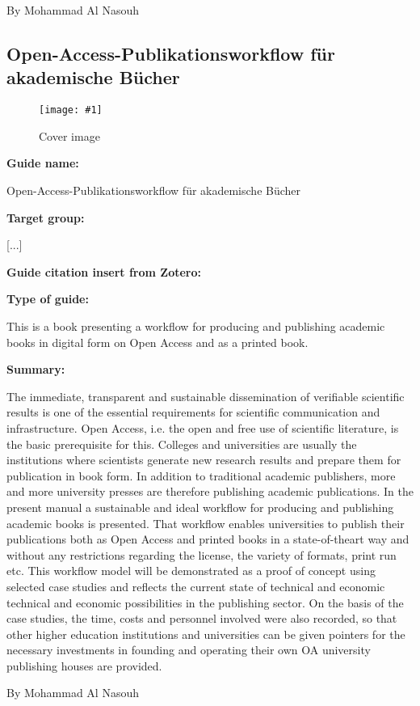 \documentclass{article}
\newlength{\imgwidth}
\newcommand\scaledgraphics[2]{%
                
\settowidth{\imgwidth}{\texttt{[image: \#1]}}%
                
\setlength{\imgwidth}{\minof{\imgwidth}{#2\textwidth}}%
                
\texttt{[image: \#1]}%
                
}
\begin{document}
By Mohammad Al Nasouh 





\subsection{Open-Access-Publikationsworkflow für akademische Bücher}\label{H6691479}



\begin{center}
\begin{figure}
\scaledgraphics{39363ae5-01d9-4e5a-a46f-bf20971df65a.jpg}{0.5}
\caption*{Cover image}\label{F7674061}
\end{figure}


\end{center}




\textbf{Guide name:} 

Open-Access-Publikationsworkflow für akademische Bücher


\textbf{Target group:}

[...]


\textbf{Guide citation insert from Zotero:}

\autocite{bohm_open-access-publikationsworkflow_2020}


\textbf{Type of guide: }

This is a book presenting a workflow for producing and publishing academic books in digital form on Open Access and as a printed book.


\textbf{Summary: }

The immediate, transparent and sustainable dissemination of verifiable scientific results is one of the essential requirements for scientific communication and infrastructure. Open Access, i.e. the open and free use of scientific literature, is the basic prerequisite for this. Colleges and universities are usually the institutions where scientists generate new research results and prepare them for publication in book form. In addition to traditional academic publishers, more and more university presses are therefore publishing academic publications. In the present manual a sustainable and ideal workflow for producing and publishing academic books is presented. That workflow enables universities to publish their publications both as Open Access and printed books in a state-of-theart way and without any restrictions regarding the license, the variety of formats, print run etc. This workflow model will be demonstrated as a proof of concept using selected case studies and reflects the current state of technical and economic technical and economic possibilities in the publishing sector. On the basis of the case studies, the time, costs and personnel involved were also recorded, so that other higher education institutions and universities can be given pointers for the necessary investments in founding and operating their own OA university publishing houses are provided.


By Mohammad Al Nasouh





\printbibliography[title={Bibliography}]
\end{document}
